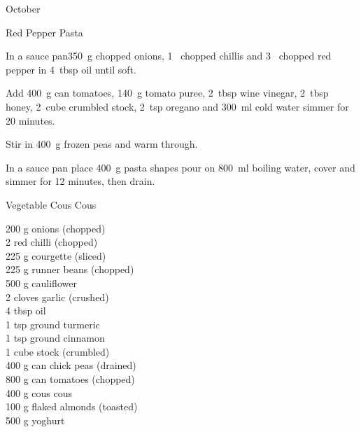 \begin{menu}{October}
\begin{recipe}{2}{Red Pepper Pasta}
    \begin{instructions}
    \item 
        In a sauce pan350~g chopped onions,
        1~ chopped chillis
        and
        3~ chopped red pepper
        in
        4~tbsp  oil
        until soft.
      \item 
        Add
        400~g  can tomatoes,
        140~g  tomato puree,
        2~tbsp  wine vinegar,
        2~tbsp  honey,
        2~cube crumbled stock,
        2~tsp  oregano
        and
        300~ml  cold water
        simmer for 20 minutes.
      \item 
        Stir in
        400~g  frozen peas
        and warm through.
      \item 
      In a
      sauce pan
      place
      400~g  pasta shapes
      pour on
      800~ml  boiling water,
      cover and simmer for 12 minutes, then drain.
    
    \end{instructions}
    \end{recipe}%
  
    \begin{recipe}{2}{Vegetable Cous Cous}%
		\begin{ingredients}
		200 g onions (chopped) \\
	2  red chilli (chopped) \\
	225 g courgette (sliced) \\
	225 g runner beans (chopped) \\
	500 g cauliflower  \\
	2 cloves garlic (crushed) \\
	4 tbsp oil  \\
	1 tsp ground turmeric  \\
	1 tsp ground cinnamon  \\
	1 cube stock (crumbled) \\
	400 g can chick peas (drained) \\
	800 g can tomatoes (chopped) \\
	400 g cous cous  \\
	100 g flaked almonds (toasted) \\
	500 g yoghurt  \\
	
		\end{ingredients}
	

\end{recipe}
\end{menu}
